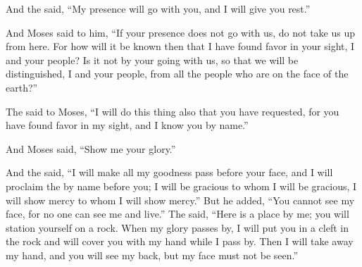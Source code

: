 {\par }{\PP {}And the
{} said,
“My presence
will go
with you, and I will give you rest.”
\par }{\PP {}And Moses said
to him,
“If
your presence
does not
go
with us, do not
take us up
from here.
For
how
will it be known
then
that
I have found
favor
in your sight,
I
and your people? Is it not
by your going
with
us, so that we will be distinguished,
I
and your people,
from all
the people
who
are on
the face
of the earth?”
\par }{\PP {}The
{}
said
to
Moses,
“I will do
this
thing
also
that
you have requested,
for
you have found
favor
in my sight,
and I know
you by name.”
\par }{\PP {}And Moses said,
“Show
me
your glory.”
\par }{\PP {}And the
{} said,
“I
will make all
my goodness
pass
before your face,
and I will proclaim
the {}
by name
before
you; I will be gracious
to whom
I will be gracious,
I will show mercy
to whom
I will show mercy.”
But he added,
“You cannot
see
my face,
for
no
one
can see
me and live.”
The
{}
said,
“Here
is a place
by me; you will station
yourself on
a rock.
When
my glory
passes
by, I will put
you in a cleft
in the rock
and will cover you with
my hand
while
I pass by.
Then I will take away
my hand,
and you will see
my back,
but my face
must not
be seen.”

}
